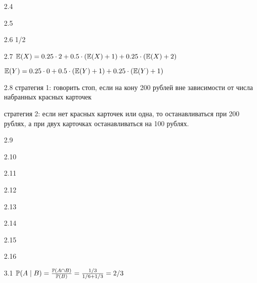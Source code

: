 \protect \hypertarget {soln:2.4}{}
\begin{solution}{{2.4}}
\end{solution}
\protect \hypertarget {soln:2.5}{}
\begin{solution}{{2.5}}
\end{solution}
\protect \hypertarget {soln:2.6}{}
\begin{solution}{{2.6}}
  1/2
\end{solution}
\protect \hypertarget {soln:2.7}{}
\begin{solution}{{2.7}}
  $\E(X)=0.25\cdot 2 + 0.5\cdot (\E(X)+1)+0.25\cdot (\E(X)+2)$

  $\E(Y)=0.25\cdot 0 + 0.5\cdot (\E(Y)+1)+0.25\cdot (\E(Y)+1)$
\end{solution}
\protect \hypertarget {soln:2.8}{}
\begin{solution}{{2.8}}
стратегия 1: говорить стоп, если на кону 200 рублей вне зависимости от числа набранных красных карточек

 стратегия 2: если нет красных карточек или одна, то останавливаться при 200 рублях, а при двух карточках останавливаться на 100 рублях.
\end{solution}
\protect \hypertarget {soln:2.9}{}
\begin{solution}{{2.9}}
\end{solution}
\protect \hypertarget {soln:2.10}{}
\begin{solution}{{2.10}}
\end{solution}
\protect \hypertarget {soln:2.11}{}
\begin{solution}{{2.11}}
\end{solution}
\protect \hypertarget {soln:2.12}{}
\begin{solution}{{2.12}}
\end{solution}
\protect \hypertarget {soln:2.13}{}
\begin{solution}{{2.13}}
\end{solution}
\protect \hypertarget {soln:2.14}{}
\begin{solution}{{2.14}}
\end{solution}
\protect \hypertarget {soln:2.15}{}
\begin{solution}{{2.15}}
\end{solution}
\protect \hypertarget {soln:2.16}{}
\begin{solution}{{2.16}}
\end{solution}
\protect \hypertarget {soln:3.1}{}
\begin{solution}{{3.1}}
  $\P(A\mid B)=\frac{\P(A \cap B)}{\P(B)}= \frac{1/3}{1/6+1/3}=2/3$
\end{solution}
